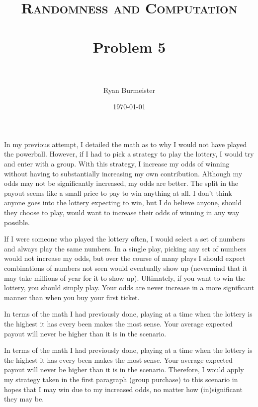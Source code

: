 \documentclass[fontsize=12pt]{article}
\title{ 
  \normalfont \normalsize 
  \textsc{Randomness and Computation} \\ [25pt] %
  \horrule{0.5pt} \\[0.4cm] %
  \huge Problem 5 \\ %
  \horrule{2pt} \\[0.5cm] %
}
\author{Ryan Burmeister} %
\date{\normalsize\today} %
\numberwithin{equation}{section} %
\numberwithin{figure}{section} %
\numberwithin{table}{section} %
\begin{document}
\maketitle %
In my previous attempt, I detailed the math as to why I would not have played the
powerball.  However, if I had to pick a strategy to play the lottery, I would try
and enter with a group.  With this strategy, I increase my odds of winning without
having to substantially increasing my own contribution.  Although my odds may not
be significantly increased, my odds are better.  The split in the payout seems like
a small price to pay to win anything at all.  I don't think anyone goes into the
lottery expecting to win, but I do believe anyone, should they choose to play, would
want to increase their odds of winning in any way possible.

\par If I were someone who played the lottery often, I would select a set of
numbers and always play the same numbers.  In a single play, picking any set of
numbers would not increase my odds, but over the course of many plays I should
expect combinations of numbers not seen would eventually show up (nevermind
that it may take millions of year for it to show up).  Ultimately, if you want
to win the lottery, you should simply play.  Your odds are never increase in a
more significant manner than when you buy your first ticket.

\par In terms of the math I had previously done, playing at a time when the
lottery is the highest it has every been makes the most sense.  Your average
expected payout will never be higher than it is in the scenario.

\par In terms of the math I had previously done, playing at a time when the
lottery is the highest it has every been makes the most sense.  Your average
expected payout will never be higher than it is in the scenario.  Therefore, I
would apply my strategy taken in the first paragraph (group purchase) to this
scenario in hopes that I may win due to my increased odds, no matter how
(in)significant they may be.
\end{document}
